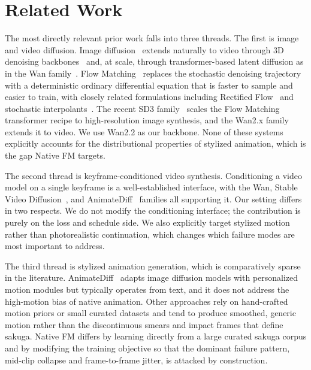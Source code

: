 \documentclass[10pt,twocolumn]{article}
\begin{document}
\section{Related Work}

The most directly relevant prior work falls into three threads. The first is image and video diffusion. Image diffusion~\cite{ho2020denoising,rombach2022high} extends naturally to video through 3D denoising backbones~\cite{ho2022video,blattmann2023stable} and, at scale, through transformer-based latent diffusion as in the Wan family~\cite{wan2025team}. Flow Matching~\cite{lipman2023flow} replaces the stochastic denoising trajectory with a deterministic ordinary differential equation that is faster to sample and easier to train, with closely related formulations including Rectified Flow~\cite{liu2023rectified} and stochastic interpolants~\cite{albergo2023interpolants}. The recent SD3 family~\cite{esser2024scaling} scales the Flow Matching transformer recipe to high-resolution image synthesis, and the Wan2.x family~\cite{wan2025team} extends it to video. We use Wan2.2 as our backbone. None of these systems explicitly accounts for the distributional properties of stylized animation, which is the gap Native FM targets.

The second thread is keyframe-conditioned video synthesis. Conditioning a video model on a single keyframe is a well-established interface, with the Wan, Stable Video Diffusion~\cite{blattmann2023stable}, and AnimateDiff~\cite{guo2024animatediff} families all supporting it. Our setting differs in two respects. We do not modify the conditioning interface; the contribution is purely on the loss and schedule side. We also explicitly target stylized motion rather than photorealistic continuation, which changes which failure modes are most important to address.

The third thread is stylized animation generation, which is comparatively sparse in the literature. AnimateDiff~\cite{guo2024animatediff} adapts image diffusion models with personalized motion modules but typically operates from text, and it does not address the high-motion bias of native animation. Other approaches rely on hand-crafted motion priors or small curated datasets and tend to produce smoothed, generic motion rather than the discontinuous smears and impact frames that define sakuga. Native FM differs by learning directly from a large curated sakuga corpus and by modifying the training objective so that the dominant failure pattern, mid-clip collapse and frame-to-frame jitter, is attacked by construction.
\end{document}
